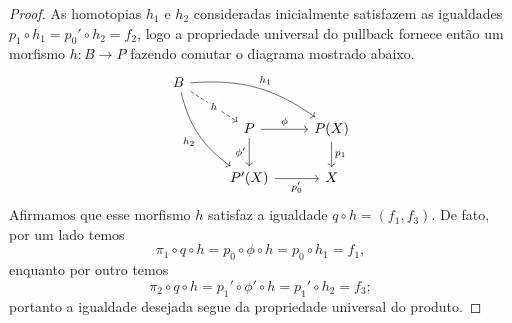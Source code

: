 \begin{proof}
  As homotopias $h_{1}$ e $h_{2}$ consideradas inicialmente satisfazem as igualdades $p_{1} \circ h_{1} = p_{0}' \circ h_{2} = f_{2}$, logo a propriedade universal do pullback fornece então um morfismo $h: B \to P$ fazendo comutar o diagrama mostrado abaixo.
  \begin{displaymath}
    \begin{tikzcd}
      B
      \arrow[rrd, bend left=20, "h_{1}"]
      \arrow[rdd, bend right=20, "h_{2}" swap]
      \arrow[rd, dashed, "h" description]
      \\ & P
      \arrow[r, "\phi"]
      \arrow[d, "\phi'" swap]
      & P(X)
      \arrow[d, "p_{1}"]
      \\ & P'(X)
      \arrow[r, "p_{0}'" swap]
      & X
    \end{tikzcd}
  \end{displaymath}
  Afirmamos que esse morfismo $h$ satisfaz a igualdade $q \circ h = (f_{1},f_{3})$.
  De fato, por um lado temos
  \begin{displaymath}
    \pi_{1} \circ q \circ h = p_{0} \circ \phi \circ h = p_{0} \circ h_{1} = f_{1},
  \end{displaymath}
  enquanto por outro temos
  \begin{displaymath}
    \pi_{2} \circ q \circ h = p_{1}' \circ \phi' \circ h = p_{1}' \circ h_{2} = f_{3};
  \end{displaymath}
  portanto a igualdade desejada segue da propriedade universal do produto.


\end{proof}
